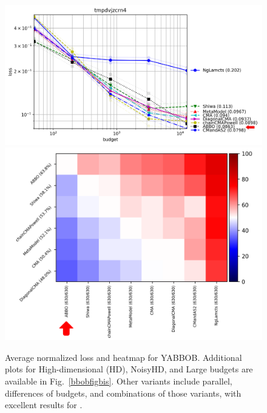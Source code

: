 \begin{figure}[t] %
    \includegraphics[trim={0 0 0 20},clip,width=.55\textwidth]{sections/appendix/h220benchmarks/benchmark/xp_yabbob.png}
       \includegraphics[width=.4\textwidth]{sections/appendix/h220benchmarks/benchmark/fa_yabbob.png}\\
       
	\caption{Average normalized loss and heatmap for YABBOB. Additional plots for High-dimensional (HD), NoisyHD, and Large budgets are available in Fig.~\ref{bbobfigbis}. Other variants include parallel, differences of budgets, and combinations of those variants, with excellent results for \ngoptq{}.}
    \label{bbobfig}
\end{figure}
